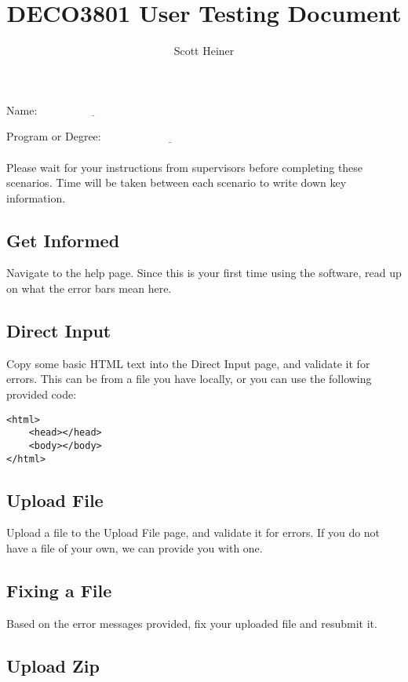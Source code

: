 \documentclass[10pt]{article}
\title{\bf DECO3801 User Testing Document}
\author{Scott Heiner}
\date{}
\begin{document}
\maketitle

Name: $\underline{\hspace{4cm}}$

Program or Degree: $\underline{\hspace{5cm}}$ \\ \\

Please wait for your instructions from supervisors before completing these scenarios. Time will be taken between each scenario to write down key information.

\subsection*{Get Informed}

Navigate to the help page. Since this is your first time using the software, read up on what the error bars mean here.

\subsection*{Direct Input}

Copy some basic HTML text into the Direct Input page, and validate it for errors. This can be from a file you have locally, or you can use the following provided code:
\begin{verbatim}
<html>
	<head></head>
	<body></body>
</html>
\end{verbatim}

\subsection*{Upload File}

Upload a file to the Upload File page, and validate it for errors. If you do not have a file of your own, we can provide you with one.

\subsection*{Fixing a File}

Based on the error messages provided, fix your uploaded file and resubmit it.

\subsection*{Upload Zip}
\end{document}
